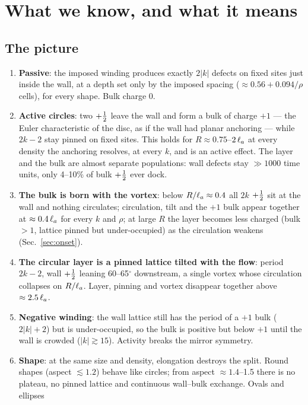 \section{What we know, and what it means}\label{sec:discussion}
\subsection{The picture}
\begin{enumerate}
  \item \textbf{Passive}: the imposed winding produces exactly $2|k|$ defects on fixed sites just inside the wall, at a depth set only by the
        imposed spacing ($\approx0.56+0.094/\rho$ cells), for every shape. Bulk charge 0.
  \item \textbf{Active circles}: two $+\tfrac12$ leave the wall and form a bulk of charge $+1$ --- the Euler characteristic of the disc,
        as if the wall had planar anchoring --- while $2k-2$ stay pinned on fixed sites. This holds for $R\approx0.75$--$2\,\ell_a$ at every
        density the anchoring resolves, at every $k$, and is an active effect. The layer and the bulk are almost separate populations:
        wall defects stay $\gg1000$ time units, only 4--10\% of bulk $+\tfrac12$ ever dock.
  \item \textbf{The bulk is born with the vortex}: below $R/\ell_a\approx0.4$ all $2k$ $+\tfrac12$ sit at the wall and nothing circulates; circulation,
        tilt and the $+1$ bulk appear together at $\approx0.4\,\ell_a$ for every $k$ and $\rho$; at large $R$ the layer becomes less charged
        (bulk $>1$, lattice pinned but under-occupied) as the circulation weakens (Sec.~\ref{sec:onset}).
  \item \textbf{The circular layer is a pinned lattice tilted with the flow}: period $2k-2$, wall $+\tfrac12$ leaning 60--65$^\circ$ downstream,
        a single vortex whose circulation collapses on $R/\ell_a$. Layer, pinning and vortex disappear together above $\approx2.5\,\ell_a$.
  \item \textbf{Negative winding}: the wall lattice still has the period of a $+1$ bulk ($2|k|+2$) but is under-occupied, so the bulk is
        positive but below $+1$ until the wall is crowded ($|k|\gtrsim15$). Activity breaks the mirror symmetry.
  \item \textbf{Shape}: at the same size and density, elongation destroys the split. Round shapes (aspect $\lesssim1.2$) behave like
        circles; from aspect $\approx1.4$--1.5 there is no plateau, no pinned lattice and continuous wall--bulk exchange. Ovals and ellipses

\end{enumerate}
